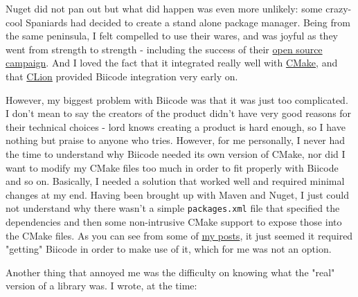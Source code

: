 \documentclass{book}
\begin{document}
Nuget did not pan out but what did happen was even more unlikely: some
crazy-cool Spaniards had decided to create a stand alone package
manager. Being from the same peninsula, I felt compelled to use their
wares, and was joyful as they went from strength to strength -
including the success of their \href{https://www.biicode.com/biicode-open-source-challenge}{open source campaign}. And I loved the
fact that it integrated really well with \href{https://cmake.org}{CMake}, and that \href{https://www.jetbrains.com/clion/}{CLion}
provided Biicode integration very early on.

However, my biggest problem with Biicode was that it was just too
complicated. I don't mean to say the creators of the product didn't
have very good reasons for their technical choices - lord knows
creating a product is hard enough, so I have nothing but praise to
anyone who tries. However, for me personally, I never had the time to
understand why Biicode needed its own version of CMake, nor did I want
to modify my CMake files too much in order to fit properly with
Biicode and so on. Basically, I needed a solution that worked well and
required minimal changes at my end. Having been brought up with Maven
and Nuget, I just could not understand why there wasn't a simple
\texttt{packages.xml} file that specified the dependencies and then some
non-intrusive CMake support to expose those into the CMake files. As
you can see from some of \href{http://forum.biicode.com/t/building-out-of-tree-using-biicode/460}{my posts}, it just seemed it required
"getting" Biicode in order to make use of it, which for me was not an
option.

Another thing that annoyed me was the difficulty on knowing what the
"real" version of a library was. I wrote, at the time:
\end{document}
